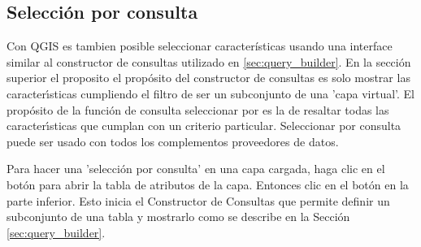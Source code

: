 \subsection{Selecci\'on por consulta}\label{sec:select_by_query}

Con QGIS es tambien posible seleccionar caracter\'isticas usando una interface similar al constructor de consultas utilizado en \ref{sec:query_builder}. En la secci\'on superior el proposito el prop\'osito del constructor de consultas es solo mostrar las caracter\'{\i}sticas cumpliendo el filtro de ser un subconjunto de una 'capa virtual'. El prop\'osito de la funci\'on de consulta seleccionar por es la de resaltar todas las caracter\'{\i}sticas que cumplan con un criterio particular. Seleccionar por consulta puede ser usado con todos los complementos proveedores de datos.

Para hacer una 'selecci\'on por consulta' en una capa cargada, haga clic en el bot\'on  para abrir la tabla de atributos de la capa. Entonces clic en el bot\'on  en la parte inferior. Esto inicia el Constructor de Consultas que permite definir un subconjunto de una tabla y mostrarlo como se describe en la Secci\'on \ref{sec:query_builder}.


